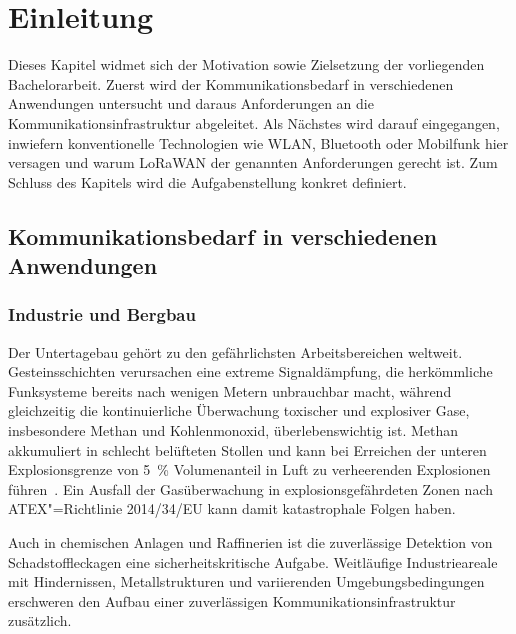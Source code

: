 
\chapter{Einleitung}
\label{chap:einleitung}
Dieses Kapitel widmet sich der Motivation sowie Zielsetzung der vorliegenden Bachelorarbeit. 
Zuerst wird der Kommunikationsbedarf in verschiedenen Anwendungen untersucht und daraus Anforderungen an die
Kommunikationsinfrastruktur abgeleitet. Als Nächstes wird darauf eingegangen, inwiefern konventionelle Technologien
wie WLAN, Bluetooth oder Mobilfunk hier versagen und warum LoRaWAN der genannten Anforderungen gerecht ist. Zum Schluss
des Kapitels wird die Aufgabenstellung konkret definiert.  

\section{Kommunikationsbedarf in verschiedenen Anwendungen}
\label{sec:einsatzszenarien}

\subsection{Industrie und Bergbau}
\label{subsec:uc-industrie}

Der Untertagebau gehört zu den gefährlichsten Arbeitsbereichen weltweit. Gesteinsschichten
verursachen eine extreme Signaldämpfung, die herkömmliche Funksysteme bereits nach
wenigen Metern unbrauchbar macht, während gleichzeitig die kontinuierliche Überwachung
toxischer und explosiver Gase, insbesondere Methan und Kohlenmonoxid,
überlebenswichtig ist. Methan akkumuliert in schlecht belüfteten Stollen
und kann bei Erreichen der unteren Explosionsgrenze von \SI{5}{\percent} Volumenanteil
in Luft zu verheerenden Explosionen führen~\cite{rumbleCRCHandbookChemistry2021}. Ein Ausfall der
Gasüberwachung in explosionsgefährdeten Zonen nach ATEX"=Richtlinie 2014/34/EU
kann damit katastrophale Folgen haben.

Auch in chemischen Anlagen und Raffinerien ist die zuverlässige Detektion von
Schadstoffleckagen eine sicherheitskritische Aufgabe. Weitläufige Industrieareale
mit Hindernissen, Metallstrukturen und variierenden Umgebungsbedingungen
erschweren den Aufbau einer zuverlässigen Kommunikationsinfrastruktur zusätzlich.


